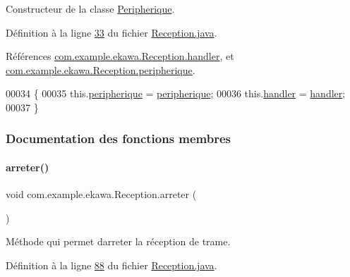 Constructeur de la classe \hyperlink{classcom_1_1example_1_1ekawa_1_1_peripherique}{Peripherique}. 



Définition à la ligne \hyperlink{_reception_8java_source_l00033}{33} du fichier \hyperlink{_reception_8java_source}{Reception.\+java}.



Références \hyperlink{_reception_8java_source_l00027}{com.\+example.\+ekawa.\+Reception.\+handler}, et \hyperlink{_reception_8java_source_l00026}{com.\+example.\+ekawa.\+Reception.\+peripherique}.


\begin{DoxyCode}
00034     \{
00035         this.\hyperlink{classcom_1_1example_1_1ekawa_1_1_reception_a9f41511c4449d90da78017ca698367ef}{peripherique} = \hyperlink{classcom_1_1example_1_1ekawa_1_1_reception_a9f41511c4449d90da78017ca698367ef}{peripherique};
00036         this.\hyperlink{classcom_1_1example_1_1ekawa_1_1_reception_ab6273fbebb5aca17b9f95e275f1d3d38}{handler} = \hyperlink{classcom_1_1example_1_1ekawa_1_1_reception_ab6273fbebb5aca17b9f95e275f1d3d38}{handler};
00037     \}
\end{DoxyCode}


\subsubsection{Documentation des fonctions membres}
\mbox{\label{classcom_1_1example_1_1ekawa_1_1_reception_a844c65410aaeee936f6b0d44f9df56db}} 
\paragraph{\texorpdfstring{arreter()}{arreter()}}
{\footnotesize\ttfamily void com.\+example.\+ekawa.\+Reception.\+arreter (\begin{DoxyParamCaption}{ }\end{DoxyParamCaption})}



Méthode qui permet d\textquotesingle{}arreter la réception de trame. 



Définition à la ligne \hyperlink{_reception_8java_source_l00088}{88} du fichier \hyperlink{_reception_8java_source}{Reception.\+java}.



